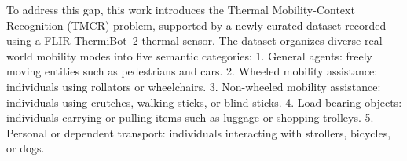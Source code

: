 \documentclass[journal,twoside,web]{ieeecolor}
\begin{document}
To address this gap, this work introduces the Thermal Mobility-Context Recognition (TMCR) problem, supported by a newly curated dataset recorded using a FLIR ThermiBot~2 thermal sensor. The dataset organizes diverse real-world mobility modes into five semantic categories: 1. General agents: freely moving entities such as pedestrians and cars. 2. Wheeled mobility assistance: individuals using rollators or wheelchairs. 3. Non-wheeled mobility assistance: individuals using crutches, walking sticks, or blind sticks. 4. Load-bearing objects: individuals carrying or pulling items such as luggage or shopping trolleys. 5. Personal or dependent transport: individuals interacting with strollers, bicycles, or dogs.
\end{document}
